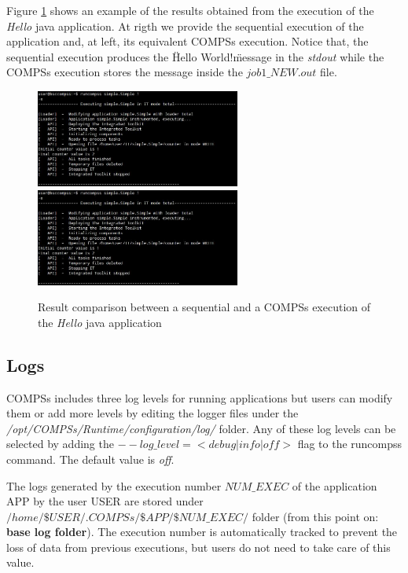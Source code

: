 Figure \ref{fig:hello_exec_results} shows an example of the results obtained from the execution of the \textit{Hello} java 
application. At rigth we provide the sequential execution of the application and, at left, its equivalent COMPSs execution. 
Notice that, the sequential execution produces the \" Hello World!\" message in the \textit{stdout} while the COMPSs execution 
stores the message inside the \textit{$job1\_NEW.out$} file.
\begin{figure}[h!]
  \centering
    \includegraphics[width=0.6\textwidth]{./Sections/3_Results_and_Logs/Figures/hello_seq_stdout.jpeg}
    \includegraphics[width=0.6\textwidth]{./Sections/3_Results_and_Logs/Figures/hello_compss_stdout_and_job.jpeg}
    \caption{Result comparison between a sequential and a COMPSs execution of the \textit{Hello} java application}
    \label{fig:hello_exec_results}
\end{figure}

\newpage

\subsection{Logs}
COMPSs includes three log levels for running applications but users can modify them or add more levels by editing the
logger files under the \textit{/opt/COMPSs/Runtime/configuration/log/} folder. Any of these log levels can be selected by 
adding the \textit{$--log\_level=<debug | info | off >$} flag to the runcompss command. The default value is \textit{off}.

The logs generated by the execution number $NUM\_EXEC$ of the application APP by the user USER are stored under
\textit{$/home/\$USER/.COMPSs/\$APP/\$NUM\_EXEC/$} folder (from this point on: \textbf{base log folder}). The execution number is 
automatically tracked to prevent the loss of data from previous executions, but users do not need to take care of this value. 

